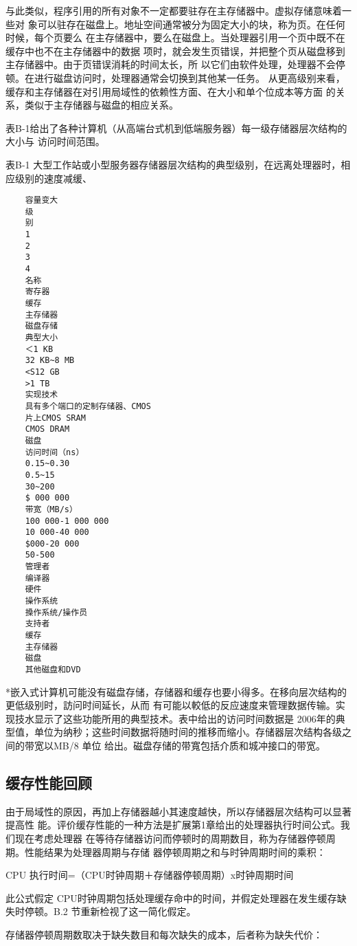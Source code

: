 与此类似，程序引用的所有对象不一定都要驻存在主存储器中。虚拟存储意味着一些对
象可以驻存在磁盘上。地址空间通常被分为固定大小的块，称为页。在任何时候，每个页要么
在主存储器中，要么在磁盘上。当处理器引用一个页中既不在缓存中也不在主存储器中的数据
项时，就会发生页错误，并把整个页从磁盘移到主存储器中。由于页错误消耗的时间太长，所
以它们由软件处理，处理器不会停顿。在进行磁盘访问时，处理器通常会切换到其他某一任务。
从更高级别来看，缓存和主存储器在对引用局域性的依赖性方面、在大小和单个位成本等方面
的关系，类似于主存储器与磁盘的相应关系。

表B-1给出了各种计算机（从高端台式机到低端服务器）每一级存储器层次结构的大小与
访问时间范围。

表B-1 大型工作站或小型服务器存储器层次结构的典型级别，在远离处理器时，相应级别的速度减缓、
\begin{verbatim}
    容量变大
    级
    别
    1
    2
    3
    4
    名称
    寄存器
    缓存
    主存储器
    磁盘存储
    典型大小
    ＜1 KB
    32 KB~8 MB
    <S12 GB
    >1 TB
    实现技术
    具有多个端口的定制存储器、CMOS
    片上CMOS SRAM
    CMOS DRAM
    磁盘
    访问时间（ns）
    0.15~0.30
    0.5~15
    30~200
    $ 000 000
    带宽（MB/s）
    100 000-1 000 000
    10 000-40 000
    $000-20 000
    50-500
    管理者
    编译器
    硬件
    操作系统
    搡作系统/操作员
    支持者
    缓存
    主存储器
    磁盘
    其他磁盘和DVD
\end{verbatim}
*嵌入式计算机可能没有磁盘存储，存储器和缓存也要小得多。在移向层次结构的更低级别时，訪问时间延长，从而
有可能以較低的反应速度来管理数据传输。实现技水显示了这些功能所用的典型技术。表中给出的访问时间数据是
2006年的典型值，单位为纳秒；这些时间数据将随时间的推移而缩小。存储器层次结构各级之间的带宽以MB/8 单位
给出。磁盘存储的带寬包括介质和城冲接口的带宽。

\subsection{缓存性能回顾}
由于局域性的原因，再加上存储器越小其速度越快，所以存储器层次结构可以显著提高性
能。评价缓存性能的一种方法是扩展第1章给出的处理器执行时间公式。我们现在考虑处理器
在等待存储器访问而停顿时的周期数目，称为存储器停顿周期。性能结果为处理器周期与存储
器停顿周期之和与时钟周期时间的乘积：

CPU 执行时间=（CPU时钟周期＋存储器停顿周期）x时钟周期时间

此公式假定 CPU时钟周期包括处理缓存命中的时间，并假定处理器在发生缓存缺失时停顿。B.2
节重新检视了这一简化假定。

存储器停顿周期数取决于缺失数目和每次缺失的成本，后者称为缺失代价：

